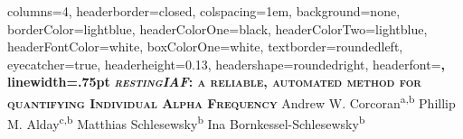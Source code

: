 \documentclass[landscape,a0paper,fontscale=.235]{xebaposter} %
\begin{document}
\begin{poster}
{
columns=4, %
headerborder=closed, %
colspacing=1em, %
background=none, %
borderColor=lightblue, %
headerColorOne=black, %
headerColorTwo=lightblue, %
headerFontColor=white, %
boxColorOne=white, %
textborder=roundedleft, %
eyecatcher=true, %
headerheight=0.13\textheight, %
headershape=roundedright, %
headerfont=\Large\bf\textsc, %
linewidth=.75pt %
}
{
\setlength\fboxsep{0pt}
\setlength\fboxrule{0pt}
}
{\bf\textsc{\emph{restingIAF}: a reliable, automated method for quantifying Individual Alpha Frequency}\vspace{.2em}} %
{\smaller Andrew W. Corcoran\textsuperscript{a,b} Phillip M. Alday\textsuperscript{c,b} Matthias Schlesewsky\textsuperscript{b} Ina Bornkessel-Schlesewsky\textsuperscript{b}} %
{
\setlength\fboxsep{0pt}
\setlength\fboxrule{0pt}
}



\end{poster}
\end{document}
